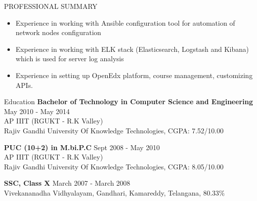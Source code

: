 \documentclass{resume} %
\begin{document}
\begin{rSection}{PROFESSIONAL SUMMARY}
\begin{itemize}
  \item Experience in working with Ansible configuration
    tool for automation of network nodes configuration

  \item Experience in working with ELK stack (Elasticsearch,
    Logstash and Kibana) which is used for server log
    analysis
    
  \item Experience in setting up OpenEdx platform, course
    management, customizing APIs.

  \end{itemize}

\end{rSection}


\begin{rSection}{Education}
  {\bf Bachelor of Technology in Computer Science and Engineering} \hfill {May 2010 - May 2014}
  \\ 
  AP IIIT (RGUKT - R.K Valley)
  \\
  Rajiv Gandhi University Of Knowledge Technologies,  CGPA: 7.52/10.00  
  
  {\bf PUC (10+2) in M.bi.P.C} \hfill {Sept 2008 - May 2010}
  \\
  AP IIIT (RGUKT - R.K Valley)
  \\
  Rajiv Gandhi University Of Knowledge Technologies,  CGPA: 8.05/10.00  
  
  {\textbf{SSC, Class X}}  \hfill March 2007 - March  2008 \\
  Vivekananadha Vidhyalayam, Gandhari, Kamareddy, Telangana, 80.33\% 

\end{rSection}

\end{document}
